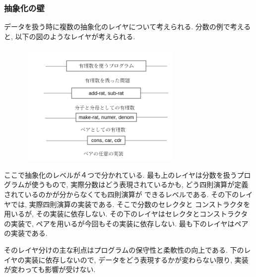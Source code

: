 \subsubsection{抽象化の壁}
データを扱う時に複数の抽象化のレイヤについて考えられる.
分数の例で考えると, 以下の図のようなレイヤが考えられる.
\vskip -0.6cm
\begin{figure}[h]
  \centering
  \includegraphics[width=8cm,height=6cm]{imgs/abstraction-barrier.png}
\end{figure}

ここで抽象化のレベルが４つで分かれている. 最も上のレイヤは分数を扱うプログラムが使うもので,
実際分数はどう表現されているかも, どう四則演算が定義されているのかが分からなくても四則演算が
できるレベルである. その下のレイヤでは, 実際四則演算の実装である. そこで分数のセレクタと
コンストラクタを用いるが, その実装に依存しない. その下のレイヤはセレクタとコンストラクタの実装で,
ペアを用いるが今回もその実装に依存しない. 最も下のレイヤはペアの実装である.

そのレイヤ分けの主な利点はプログラムの保守性と柔軟性の向上である.
下のレイヤの実装に依存しないので, データをどう表現するかが変わらない限り,
実装が変わっても影響が受けない.
